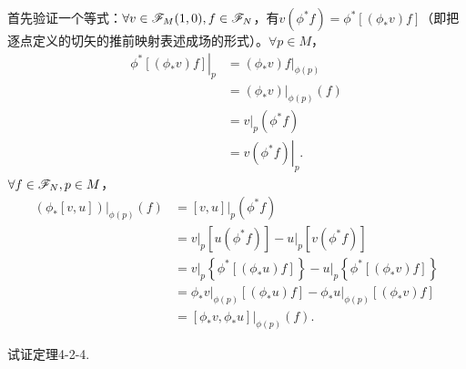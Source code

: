 \begin{xiti}
	\begin{zm}
		首先验证一个等式：$\forall v \in \mathscr{F}_M(1,0),f\in \mathscr{F}_N $，有$v(\phi^* f)=\phi^*\left[ (\phi_* v)f \right] $（即把逐点定义的切矢的推前映射表述成场的形式）。$\forall p \in M $，
		\begin{align*}
		\left. \phi^*\left[ (\phi_* v)f \right] \right|_p &= \left. (\phi_* v)f \right|_{\phi(p)} \\
		&= \left. (\phi_* v) \right|_{\phi(p)}(f)\\
		&= \left. v \right|_p \left( \phi^* f \right)\\
		&= \left. v \left( \phi^* f \right) \right|_p.
		\end{align*}
		$\forall f\in \mathscr{F}_N,p\in M $，
		\begin{align*}
		\left. \left(\phi_*\left[v,u\right]\right) \right|_{\phi(p)} (f) &= \left. \left[v,u\right] \right|_p \left(\phi^* f \right)\\
		&= \left. v\right|_p [u(\phi^* f)]- \left. u \right|_p [v(\phi^* f)]\\
		&= \left. v \right|_p \left\{ \phi^* \left[ \left( \phi_* u \right) f \right] \right\} - \left. u \right|_p \left\{ \phi^* \left[ \left( \phi_* v \right) f \right] \right\}\\
		&= \left. \phi_* v \right|_{\phi(p)} \left[ \left( \phi_* u \right) f \right] - \left. \phi_* u \right|_{\phi(p)} \left[ \left( \phi_* v \right) f \right]\\
		&= \left. \left[\phi_* v,\phi_* u\right] \right|_{\phi(p)} (f).
		\end{align*}
	\end{zm}
	
	\item 试证定理4-2-4.
	

\end{xiti}
